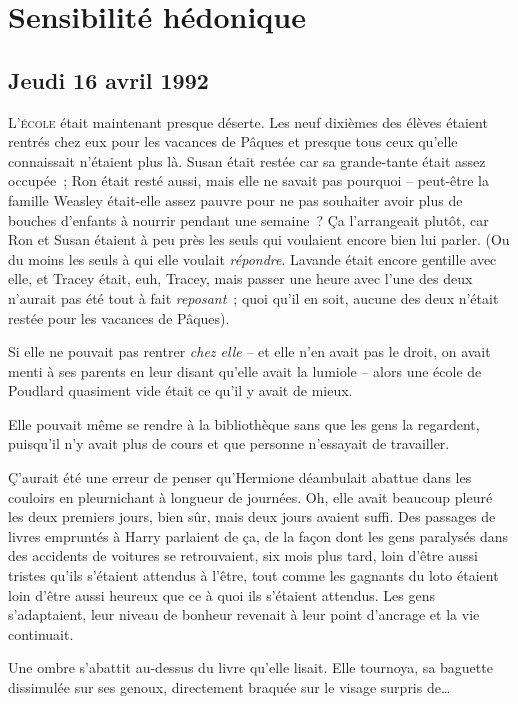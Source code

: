 \chapter{Sensibilité hédonique}

\section{Jeudi 16 avril 1992}

\lettrine{L}{'école}  était maintenant presque déserte. Les neuf dixièmes des élèves étaient rentrés chez eux pour les vacances de Pâques et presque tous ceux qu'elle connaissait n'étaient plus là. Susan était restée car sa grande-tante était assez occupée~; Ron était resté aussi, mais elle ne savait pas pourquoi -- peut-être la famille Weasley était-elle assez pauvre pour ne pas souhaiter avoir plus de bouches d'enfants à nourrir pendant une semaine~? Ça l'arrangeait plutôt, car Ron et Susan étaient à peu près les seuls qui voulaient encore bien lui parler. (Ou du moins les seuls à qui elle voulait \emph{répondre}. Lavande était encore gentille avec elle, et Tracey était, euh, Tracey, mais passer une heure avec l'une des deux n'aurait pas été tout à fait \emph{reposant}~; quoi qu'il en soit, aucune des deux n'était restée pour les vacances de Pâques).

Si elle ne pouvait pas rentrer \emph{chez elle} -- et elle n'en avait pas le droit, on avait menti à ses parents en leur disant qu'elle avait la lumiole -- alors une école de Poudlard quasiment vide était ce qu'il y avait de mieux.

Elle pouvait même se rendre à la bibliothèque sans que les gens la regardent, puisqu'il n'y avait plus de cours et que personne n'essayait de travailler.

Ç'aurait été une erreur de penser qu'Hermione déambulait abattue dans les couloirs en pleurnichant à longueur de journées. Oh, elle avait beaucoup pleuré les deux premiers jours, bien sûr, mais deux jours avaient suffi. Des passages de livres empruntés à Harry parlaient de ça, de la façon dont les gens paralysés dans des accidents de voitures se retrouvaient, six mois plus tard, loin d'être aussi tristes qu'ils s'étaient attendus à l'être, tout comme les gagnants du loto étaient loin d'être aussi heureux que ce à quoi ils s'étaient attendus. Les gens s'adaptaient, leur niveau de bonheur revenait à leur point d'ancrage et la vie continuait.

Une ombre s'abattit au-dessus du livre qu'elle lisait. Elle tournoya, sa baguette dissimulée sur ses genoux, directement braquée sur le visage surpris de…

